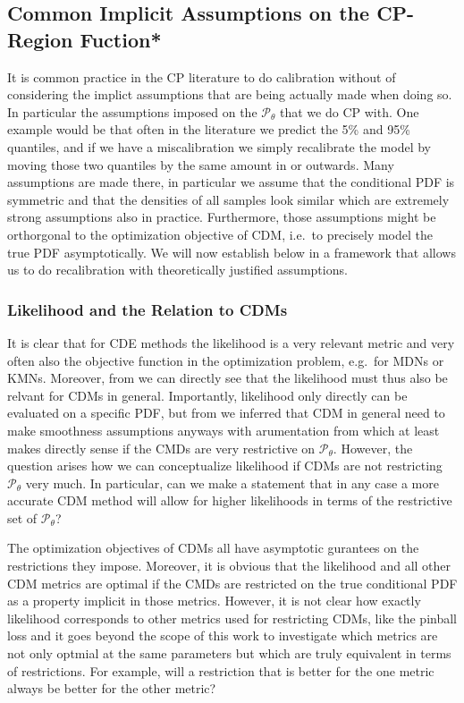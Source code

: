 \subsection{Common Implicit Assumptions on the CP-Region Fuction*}\label{sec:implicit_assumptions_cp}

It is common practice in the CP literature to do calibration without of considering the implict assumptions that are being actually made when doing so. In particular the assumptions imposed on the $\mathscr{P}_\theta$ that we do CP with. One example would be that often in the literature we predict the 5\% and 95\% quantiles, and if we have a miscalibration we simply recalibrate the model by moving those two quantiles by the same amount in or outwards. Many assumptions are made there, in particular we assume that the conditional PDF is symmetric and that the densities of all samples look similar which are extremely strong assumptions also in practice. Furthermore, those assumptions might be orthorgonal to the optimization objective of CDM, i.e.\ to precisely model the true PDF asymptotically. We will now establish below in  a framework that allows us to do recalibration with theoretically justified assumptions.

\subsubsection{Likelihood and the Relation to CDMs}\label{sec:shape_importance}

It is clear that for CDE methods the likelihood is a very relevant metric and very often also the objective function in the optimization problem, e.g.\ for MDNs or KMNs. Moreover, from  we can directly see that the likelihood must thus also be relvant for CDMs in general. Importantly, likelihood only directly can be evaluated on a specific PDF, but from  we inferred that CDM in general need to make smoothness assumptions anyways with arumentation from  which at least makes directly sense if the CMDs are very restrictive on $\mathscr{P}_\theta$. However, the question arises how we can conceptualize likelihood if CDMs are not restricting $\mathscr{P}_\theta$ very much. In particular, can we make a statement that in any case a more accurate CDM method will allow for higher likelihoods in terms of the restrictive set of $\mathscr{P}_\theta$?

The optimization objectives of CDMs all have asymptotic gurantees on the restrictions they impose. Moreover, it is obvious that the likelihood and all other CDM metrics are optimal if the CMDs are restricted on the true conditional PDF as a property implicit in those metrics. However, it is not clear how exactly likelihood corresponds to other metrics used for restricting CDMs, like the pinball loss and it goes beyond the scope of this work to investigate which metrics are not only optmial at the same parameters but which are truly equivalent in terms of restrictions. For example, will a restriction that is better for the one metric always be better for the other metric?

